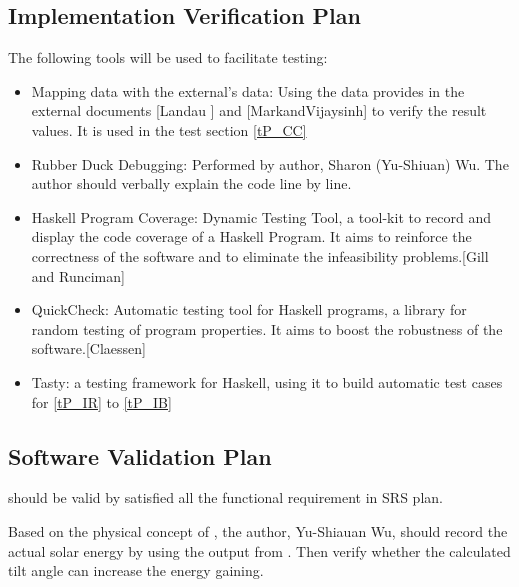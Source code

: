 \documentclass[12pt, titlepage]{article}
\begin{document}

\label{Planfordv}


\subsection{Implementation Verification Plan} 
The following tools will be used to facilitate testing: 

\begin{itemize}
\item Mapping data with the external's data: Using the data provides in the external documents [Landau ] \cite{Charles2001} and [MarkandVijaysinh] \cite{JacobsonandJadhav} to verify the result values. It is used in the test section \ref{tP_CC}

\item Rubber Duck Debugging: Performed by author, Sharon (Yu-Shiuan) Wu. The 
author should verbally explain the code line by line.
\item Haskell Program Coverage: Dynamic Testing Tool, a tool-kit to record 
and display the code coverage of a Haskell Program. It aims to reinforce the 
correctness of the software and to eliminate the infeasibility problems.[Gill
and Runciman] \cite{GillandRunciman}
\item QuickCheck: Automatic testing tool for Haskell programs, a library for
random testing of program properties. It aims to boost the robustness of the 
software.[Claessen] \cite{QuickCheck}
\item Tasty: a testing framework for Haskell, using it to build automatic test cases for \ref{tP_IR} to \ref{tP_IB}
\end{itemize} 

 



\subsection{Software Validation Plan}

\progname{} should be valid by satisfied all the functional requirement in SRS 
plan.

Based on the physical concept of \progname, the author, Yu-Shiauan Wu, should
record the actual solar energy by using the output from \progname. Then verify
whether the calculated tilt angle can increase the energy gaining.
\end{document}

